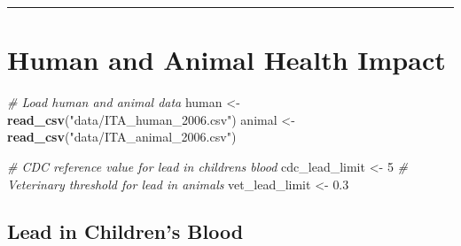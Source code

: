 \documentclass[
]{article}
\newenvironment{Shaded}{\begin{snugshade}}{\end{snugshade}}
\newcommand{\CommentTok}[1]{\textcolor[rgb]{0.56,0.35,0.01}{\textit{#1}}}
\newcommand{\DecValTok}[1]{\textcolor[rgb]{0.00,0.00,0.81}{#1}}
\newcommand{\FloatTok}[1]{\textcolor[rgb]{0.00,0.00,0.81}{#1}}
\newcommand{\FunctionTok}[1]{\textcolor[rgb]{0.13,0.29,0.53}{\textbf{#1}}}
\newcommand{\NormalTok}[1]{#1}
\newcommand{\OtherTok}[1]{\textcolor[rgb]{0.56,0.35,0.01}{#1}}
\newcommand{\StringTok}[1]{\textcolor[rgb]{0.31,0.60,0.02}{#1}}
\begin{document}
\begin{center}\rule{0.5\linewidth}{0.5pt}\end{center}

\section{Human and Animal Health
Impact}\label{human-and-animal-health-impact}

\begin{Shaded}
\begin{Highlighting}[]
\CommentTok{\# Load human and animal data}
\NormalTok{human }\OtherTok{\textless{}{-}} \FunctionTok{read\_csv}\NormalTok{(}\StringTok{"data/ITA\_human\_2006.csv"}\NormalTok{)}
\NormalTok{animal }\OtherTok{\textless{}{-}} \FunctionTok{read\_csv}\NormalTok{(}\StringTok{"data/ITA\_animal\_2006.csv"}\NormalTok{)}

\CommentTok{\# CDC reference value for lead in children\textquotesingle{}s blood}
\NormalTok{cdc\_lead\_limit }\OtherTok{\textless{}{-}} \DecValTok{5}
\CommentTok{\# Veterinary threshold for lead in animals}
\NormalTok{vet\_lead\_limit }\OtherTok{\textless{}{-}} \FloatTok{0.3}
\end{Highlighting}
\end{Shaded}

\subsection{Lead in Children's Blood}\label{lead-in-childrens-blood}
\end{document}
